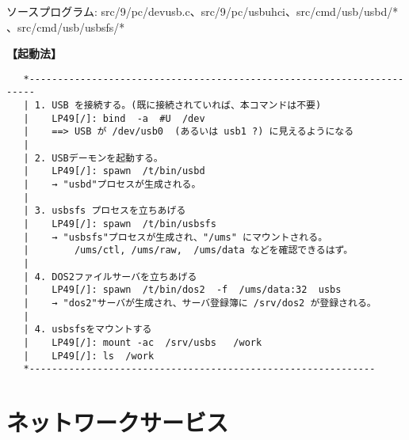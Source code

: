      ソースプログラム: src/9/pc/devusb.c、src/9/pc/usbuhci、src/cmd/usb/usbd/* 、src/cmd/usb/usbsfs/*  
  
{\bf 【起動法】}
\begin{verbatim}
   *-----------------------------------------------------------------------
   | 1. USB を接続する。(既に接続されていれば、本コマンドは不要)           
   |    LP49[/]: bind  -a  #U  /dev                                        
   |    ==> USB が /dev/usb0  (あるいは usb1 ?) に見えるようになる         
   |                                                                       
   | 2. USBデーモンを起動する。                                            
   |    LP49[/]: spawn  /t/bin/usbd                                        
   |    → "usbd"プロセスが生成される。                                     
   |                                                                       
   | 3. usbsfs プロセスを立ちあげる                                         
   |    LP49[/]: spawn  /t/bin/usbsfs                                      
   |    → "usbsfs"プロセスが生成され、"/ums" にマウントされる。            
   |        /ums/ctl, /ums/raw,  /ums/data などを確認できるはず。          
   |                                                                       
   | 4. DOS2ファイルサーバを立ちあげる                                     
   |    LP49[/]: spawn  /t/bin/dos2  -f  /ums/data:32  usbs                
   |    → "dos2"サーバが生成され、サーバ登録簿に /srv/dos2 が登録される。
   |                                                                       
   | 4. usbsfsをマウントする                                               
   |    LP49[/]: mount -ac  /srv/usbs   /work                              
   |    LP49[/]: ls  /work                                                 
   *-------------------------------------------------------------
\end{verbatim}
                                           


%


\part{ネットワークサービス}

